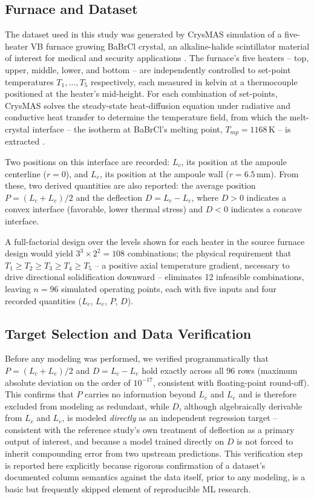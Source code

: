 \documentclass[conference]{IEEEtran}
\begin{document}
\subsection{Furnace and Dataset}
The dataset used in this study was generated by CrysMAS simulation of a five-heater VB furnace growing BaBrCl crystal, an alkaline-halide scintillator material of interest for medical and security applications \cite{yan2016}. The furnace's five heaters -- top, upper, middle, lower, and bottom -- are independently controlled to set-point temperatures $T_1,\ldots,T_5$ respectively, each measured in kelvin at a thermocouple positioned at the heater's mid-height. For each combination of set-points, CrysMAS solves the steady-state heat-diffusion equation under radiative and conductive heat transfer to determine the temperature field, from which the melt-crystal interface -- the isotherm at BaBrCl's melting point, $T_{mp}=1168\,$K -- is extracted \cite{zhang_cheng2022}.

Two positions on this interface are recorded: $L_c$, its position at the ampoule centerline ($r=0$), and $L_e$, its position at the ampoule wall ($r=6.5\,$mm). From these, two derived quantities are also reported: the average position $P=(L_c+L_e)/2$ and the deflection $D=L_c-L_e$, where $D>0$ indicates a convex interface (favorable, lower thermal stress) and $D<0$ indicates a concave interface.

A full-factorial design over the levels shown for each heater in the source furnace design would yield $3^3\times 2^2=108$ combinations; the physical requirement that $T_1\geq T_2\geq T_3\geq T_4\geq T_5$ -- a positive axial temperature gradient, necessary to drive directional solidification downward -- eliminates 12 infeasible combinations, leaving $n=96$ simulated operating points, each with five inputs and four recorded quantities ($L_c$, $L_e$, $P$, $D$).

\subsection{Target Selection and Data Verification}
Before any modeling was performed, we verified programmatically that $P=(L_c+L_e)/2$ and $D=L_c-L_e$ hold exactly across all 96 rows (maximum absolute deviation on the order of $10^{-17}$, consistent with floating-point round-off). This confirms that $P$ carries no information beyond $L_c$ and $L_e$ and is therefore excluded from modeling as redundant, while $D$, although algebraically derivable from $L_c$ and $L_e$, is modeled \emph{directly} as an independent regression target -- consistent with the reference study's own treatment of deflection as a primary output of interest, and because a model trained directly on $D$ is not forced to inherit compounding error from two upstream predictions. This verification step is reported here explicitly because rigorous confirmation of a dataset's documented column semantics against the data itself, prior to any modeling, is a basic but frequently skipped element of reproducible ML research.
\end{document}

